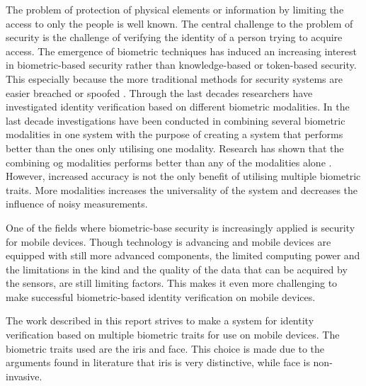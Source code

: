 The problem of protection of physical elements or information by limiting the access to only the people  is well known. The central challenge to the problem of security is the challenge of verifying the identity of a person trying to acquire access. The emergence of biometric techniques has induced an increasing interest in biometric-based security rather than knowledge-based or token-based security. This especially because the more traditional methods for security systems are easier breached or spoofed \citep{Ross2003}. Through the last decades researchers have investigated identity verification based on different biometric modalities. In the last decade investigations have been conducted in combining several biometric modalities in one system with the purpose of creating a system that performs better than the ones only utilising one modality. Research has shown that the combining og modalities performs better than any of the modalities alone \citep{Chen2005a}.  However, increased accuracy is not the only benefit of utilising multiple biometric traits. More modalities increases the universality of the system and decreases the influence of noisy measurements\citep{Ross2003}.

One of the fields where biometric-base security is increasingly applied is security for mobile devices. Though technology is advancing and mobile devices are equipped with still more advanced components, the limited computing power and the limitations in the kind and the quality of the data that can be acquired by the sensors, are still limiting factors. This makes it even more challenging to make successful biometric-based identity verification on mobile devices.

The work described in this report strives to make a system for identity verification based on multiple biometric traits for use on mobile devices. The biometric traits used are the iris and face. This choice is made due to the arguments found in literature that iris is very distinctive, while face is non-invasive.  